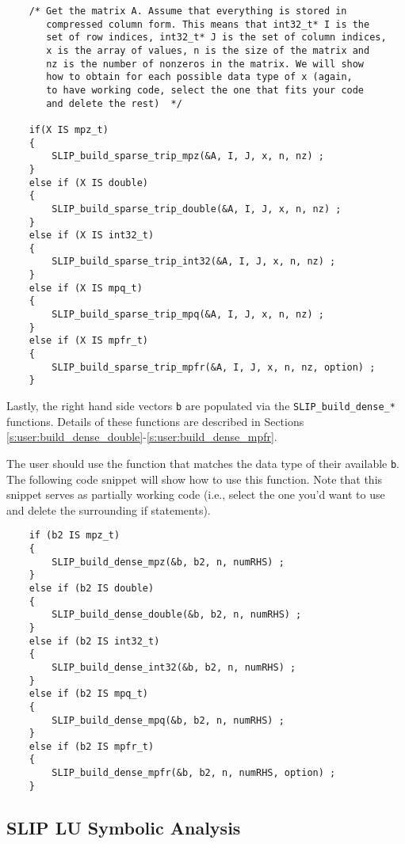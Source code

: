 \documentclass[12pt]{article}
\theoremstyle{definition}
\begin{document}
{\small
\begin{verbatim}
    /* Get the matrix A. Assume that everything is stored in
       compressed column form. This means that int32_t* I is the
       set of row indices, int32_t* J is the set of column indices,
       x is the array of values, n is the size of the matrix and
       nz is the number of nonzeros in the matrix. We will show
       how to obtain for each possible data type of x (again,
       to have working code, select the one that fits your code
       and delete the rest)  */

    if(X IS mpz_t)
    {
        SLIP_build_sparse_trip_mpz(&A, I, J, x, n, nz) ;
    }
    else if (X IS double)
    {
        SLIP_build_sparse_trip_double(&A, I, J, x, n, nz) ;
    }
    else if (X IS int32_t)
    {
        SLIP_build_sparse_trip_int32(&A, I, J, x, n, nz) ;
    }
    else if (X IS mpq_t)
    {
        SLIP_build_sparse_trip_mpq(&A, I, J, x, n, nz) ;
    }
    else if (X IS mpfr_t)
    {
        SLIP_build_sparse_trip_mpfr(&A, I, J, x, n, nz, option) ;
    } \end{verbatim} }

Lastly, the right hand side vectors \verb|b| are populated via the
\verb|SLIP_build_dense_*| functions. Details of these functions are described
in Sections \ref{s:user:build_dense_double}-\ref{s:user:build_dense_mpfr}.

The user should use the function that matches the data type of their available
\verb|b|. The following code snippet will show how to use this function. Note
that this snippet serves as partially working code (i.e., select the one you'd
want to use and delete the surrounding if statements).

{\small
    \begin{verbatim}
    if (b2 IS mpz_t)
    {
        SLIP_build_dense_mpz(&b, b2, n, numRHS) ;
    }
    else if (b2 IS double)
    {
        SLIP_build_dense_double(&b, b2, n, numRHS) ;
    }
    else if (b2 IS int32_t)
    {
        SLIP_build_dense_int32(&b, b2, n, numRHS) ;
    }
    else if (b2 IS mpq_t)
    {
        SLIP_build_dense_mpq(&b, b2, n, numRHS) ;
    }
    else if (b2 IS mpfr_t)
    {
        SLIP_build_dense_mpfr(&b, b2, n, numRHS, option) ;
    } \end{verbatim} }

\cprotect\subsection{SLIP LU Symbolic Analysis}
\label{s:Using:symb}
\end{document}
